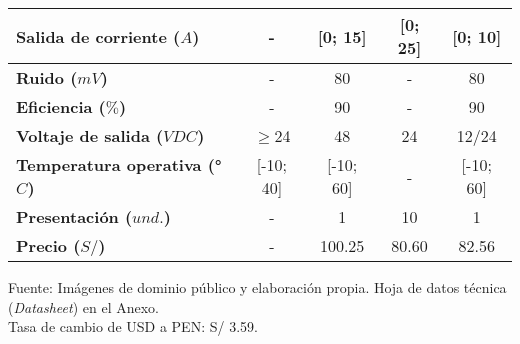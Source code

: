 \begin{savenotes}
\begin{mytable}[H]
\begin{tabular}{l|c|c|c|c|}
			\multicolumn{1}{|l|}{
				\begin{minipage}{\myforthmaxsizeofcontenttable}	
					\textbf{Salida de corriente ($A$)}
				\end{minipage}
			} & - & [0; 15] & [0; 25] & [0; 10] \\ \hline

			\multicolumn{1}{|l|}{
				\begin{minipage}{\myforthmaxsizeofcontenttable}	
					\textbf{Ruido ($mV$)}
				\end{minipage}
			} & - & 80 & - & 80 \\ \hline
		
			\multicolumn{1}{|l|}{
				\begin{minipage}{\myforthmaxsizeofcontenttable}	
					\textbf{Eficiencia ($\%$)}
				\end{minipage}
			} & - & 90 & - & 90 \\ \hline
		
			\multicolumn{1}{|l|}{
				\begin{minipage}{\myforthmaxsizeofcontenttable}	
					\textbf{Voltaje de salida ($VDC$)}
				\end{minipage}
			} & $\geq$24 & 48 & 24 & 12/24 \\ \hline
		
			\multicolumn{1}{|l|}{
				\begin{minipage}{\myforthmaxsizeofcontenttable}	
					\textbf{Temperatura operativa (°$C$)}
				\end{minipage}
			} & [-10; 40] & [-10; 60] & - & [-10; 60] \\ \hline
		
			\multicolumn{1}{|l|}{
				\begin{minipage}{\myforthmaxsizeofcontenttable}	
					\textbf{Presentación ($und.$)}
				\end{minipage}
			} & - & 1 & 10 & 1 \\ \hline
		
			\multicolumn{1}{|l|}{
				\begin{minipage}{\myforthmaxsizeofcontenttable}	
					\textbf{Precio ($S/$)}
				\end{minipage}
			} & - & 100.25 & 80.60 & 82.56 \\ \hline
		\end{tabular}
		\begin{myflushcenteraftertable}	
			Fuente: Imágenes de dominio público y elaboración propia. Hoja de datos técnica (\textit{Datasheet}) en el Anexo.\\
			Tasa de cambio de USD a PEN: S/ 3.59.
		\end{myflushcenteraftertable}
	\end{mytable}
\end{savenotes}

